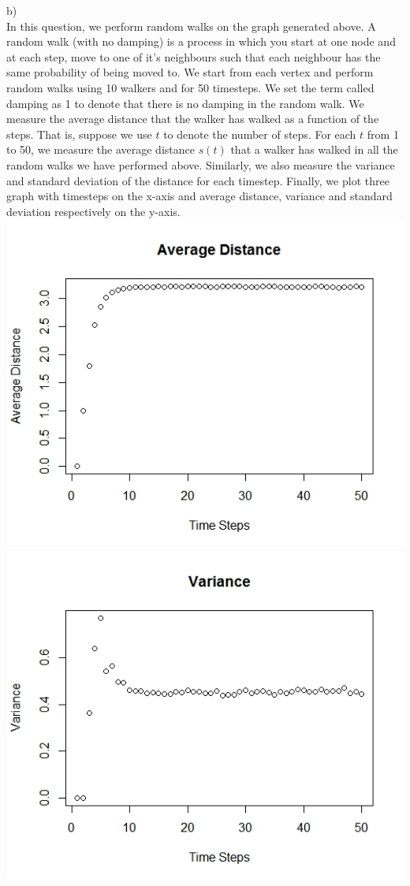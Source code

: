 \documentclass{article}
\begin{document}
b)\\
In this question, we perform random walks on the graph generated above. 
A random walk (with no damping) is a process in which you start at one node and at each step,
move to one of it's neighbours such that each neighbour has the same probability of being moved to.
We start from each vertex and 
perform random walks using 10 walkers and for 50 timesteps. We set the term called damping as 1 to denote that
there is no damping in the random walk.
We measure the average distance that the 
walker has walked as a function of the steps. That is, suppose we use $t$ to denote the number of steps.
For each $t$ from 1 to 50, we measure the average distance $s(t)$ that a walker has walked in all the random
walks we have performed above. Similarly, we also measure the variance and standard deviation of the 
distance for each timestep. Finally, we plot three graph with timesteps on the x-axis and average distance, variance
and standard deviation respectively on the y-axis.\\
\includegraphics[scale=0.4]{p1a} \\
\includegraphics[scale=0.4]{p1b} \\
\end{document}
